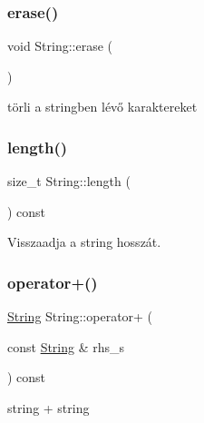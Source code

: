 \mbox{\label{class_string_a3ce2ea55be9ec912bb2dbc88d461b479}} 
\subsubsection{\texorpdfstring{erase()}{erase()}}
{\footnotesize\ttfamily void String\+::erase (\begin{DoxyParamCaption}{ }\end{DoxyParamCaption})\hspace{0.3cm}{\ttfamily [inline]}}



törli a stringben lévő karaktereket 

\mbox{\label{class_string_ad3b888edbfb3bab21d4bae4663d2211a}} 
\subsubsection{\texorpdfstring{length()}{length()}}
{\footnotesize\ttfamily size\+\_\+t String\+::length (\begin{DoxyParamCaption}{ }\end{DoxyParamCaption}) const\hspace{0.3cm}{\ttfamily [inline]}}



Visszaadja a string hosszát. 

\mbox{\label{class_string_a28a020f061e5f25317af47488bfb7de8}} 
\subsubsection{\texorpdfstring{operator+()}{operator+()}\hspace{0.1cm}{\footnotesize\ttfamily [1/2]}}
{\footnotesize\ttfamily \mbox{\hyperlink{class_string}{String}} String\+::operator+ (\begin{DoxyParamCaption}\item[{const \mbox{\hyperlink{class_string}{String}} \&}]{rhs\+\_\+s }\end{DoxyParamCaption}) const}



string + string 

